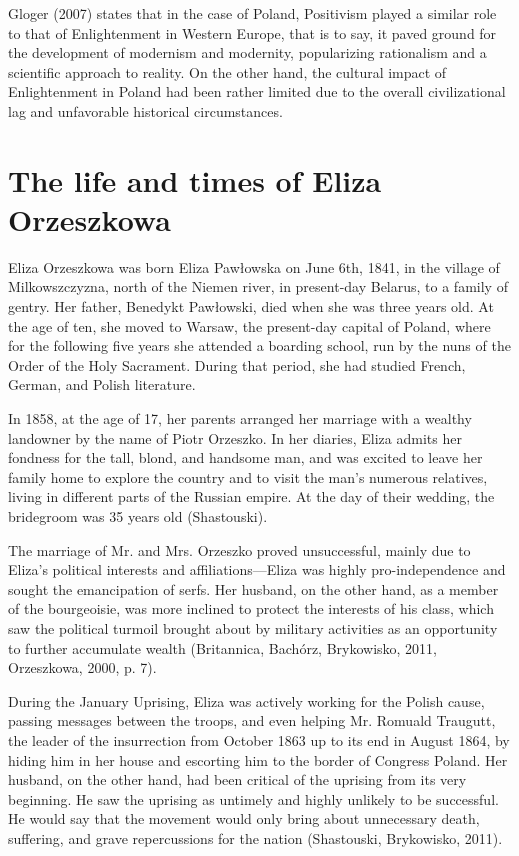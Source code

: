 Gloger (2007) states that in the case of Poland, Positivism played a similar role to that of Enlightenment in Western Europe, that is to say, it paved ground for the development of modernism and modernity, popularizing rationalism and a scientific approach to reality. On the other hand, the cultural impact of Enlightenment in Poland had been rather limited due to the overall civilizational lag and unfavorable historical circumstances.

\section{The life and times of Eliza Orzeszkowa}

Eliza Orzeszkowa was born Eliza Pawłowska on June 6th, 1841, in the village of Milkowszczyzna, north of the Niemen river, in present-day Belarus, to a family of gentry.
Her father, Benedykt Pawłowski, died when she was three years old. 
At the age of ten, she moved to Warsaw, the present-day capital of Poland, where for the following five years she attended a boarding school, run by the nuns of the Order of the Holy Sacrament.
During that period, she had studied French, German, and Polish literature.

In 1858, at the age of 17, her parents arranged her marriage with a wealthy landowner by the name of Piotr Orzeszko.
In her diaries, Eliza admits her fondness for the tall, blond, and handsome man, and was excited to leave her family home to explore the country and to visit the man's numerous relatives, living in different parts of the Russian empire.
At the day of their wedding, the bridegroom was 35 years old
(Shastouski).

The marriage of Mr. and Mrs. Orzeszko proved unsuccessful, mainly due to Eliza's political interests and affiliations---Eliza was highly pro-independence and sought the emancipation of serfs.
Her husband, on the other hand, as a member of the bourgeoisie, was more inclined to protect the interests of his class, which saw the political turmoil brought about by military activities as an opportunity to further accumulate wealth
(Britannica, Bachórz, Brykowisko, 2011, Orzeszkowa, 2000, p. 7).


During the January Uprising, Eliza was actively working for the Polish cause, passing messages between the troops, and even helping Mr. Romuald Traugutt, the leader of the insurrection from October 1863 up to its end in August 1864, by hiding him in her house and escorting him to the border of Congress Poland.
Her husband, on the other hand, had been critical of the uprising from its very beginning.
He saw the uprising as untimely and highly unlikely to be successful.
He would say that the movement would only bring about unnecessary death, suffering, and grave repercussions for the nation
(Shastouski, Brykowisko, 2011).

